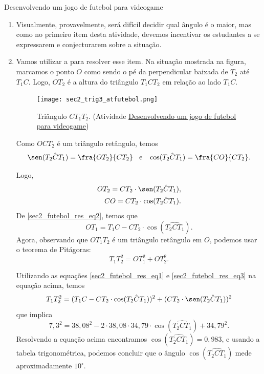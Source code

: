 \clearmargin
\mspace{.25em}
\begin{answer}{Desenvolvendo um jogo de futebol para videogame}
{
\begin{enumerate}
\item Visualmente, provavelmente, será difícil decidir qual ângulo é o maior, mas como no primeiro item desta atividade, devemos incentivar os estudantes a se expressarem e conjecturarem sobre a situação. 
    
    \item{}
    Vamos utilizar a  para resolver esse item. Na situação mostrada na figura, marcamos o ponto $O$ como sendo o pé da perpendicular baixada de $T_2$ até $T_1C$. Logo, $OT_2$ é a altura do triângulo $T_1CT_2$ em relação ao lado $T_1C$. 

    \notas
    {
    {
    \begin{minipage}{\linewidth}
        \begin{figure}[H]
            \centering
            \texttt{[image: sec2\_trig3\_atfutebol.png]}
            \caption{Triângulo $CT_1T_2$. (Atividade \hyperref[desenvolvendo-jogo]{Desenvolvendo um jogo de futebol para videogame})}
            \label{sec2_futebol_res3_fig}
        \end{figure}
    \end{minipage}
    }
    }
     
    Como $OCT_2$ é um triângulo retângulo, temos
    $$\sen(\hat{T_2CT_1})=\fra{OT_2}{CT_2}\;\; \text{ e } \;\; \cos(\hat{T_2CT_1})=\fra{CO}{CT_2}.$$
    
    Logo,
    \begin{eqnarray}
    OT_2=CT_2 \cdot \sen(\hat{T_2CT_1}),\label{sec2_futebol_res_eq1}\\
    CO=CT_2 \cdot \cos(\hat{T_2CT_1}).\label{sec2_futebol_res_eq2}
    \end{eqnarray}
    De \eqref{sec2_futebol_res_eq2}, temos que
    \begin{equation}
        OT_1=T_1C-CT_2\cdot\cos(\hat{T_2CT_1}).\label{sec2_futebol_res_eq3}
    \end{equation}
    Agora, observando que $OT_1T_2$ é um triângulo retângulo em $O$, podemos usar o teorema de Pitágoras:
    $$T_1T_2^2=OT_1^2+OT_2^2.$$
    
    Utilizando as equações \eqref{sec2_futebol_res_eq1} e \eqref{sec2_futebol_res_eq3} na equação acima, temos
    $$T_1T_2^2=(T_1C-CT_2\cdot\cos(\hat{T_2CT_1}))^2+(CT_2\cdot\sen(\hat{T_2CT_1}))^2$$
    que implica
    $$7,3^2=38,08^2-2\cdot 38,08\cdot 34,79\cdot \cos(\hat{T_2CT_1})+34,79^2.$$
    Resolvendo a equação acima encontramos $\cos(\hat{T_2CT_1})=0,983$, e usando a tabela trigonométrica, podemos concluir que o ângulo $\cos(\hat{T_2CT_1})$ mede aproximadamente $10^\circ$.
     

\end{enumerate}}
\end{answer}
